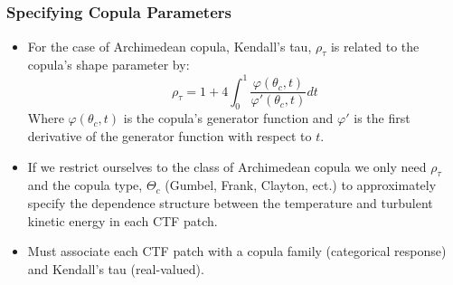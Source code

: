 \documentclass[t, pdftex]{beamer}
\begin{document}
\subsection{}
\begin{frame}[noframenumbering]
\frametitle{Specifying Copula Parameters}
\begin{itemize}
\item For the case of Archimedean copula, Kendall's tau, $\rho_\tau$ is
related to the copula's shape parameter by:
\[
\rho_\tau = 1 + 4 \int_0^1 \frac{\varphi(\theta_c,t)}{\varphi'(\theta_c, t)}dt
\]
Where $\varphi(\theta_c, t)$ is the copula's generator function and $\varphi'$ is the first derivative of the generator function with respect to $t$.
\item  If we restrict ourselves to the class of  Archimedean copula we only need $\rho_\tau$ and the copula type, $\Theta_c$ (Gumbel, Frank, Clayton, ect.) to approximately specify the dependence structure between the temperature and turbulent kinetic energy in each CTF patch.
\item Must associate each CTF patch with a copula family (categorical response) and Kendall's tau (real-valued).
\end{itemize}
\end{frame}

\end{document}
